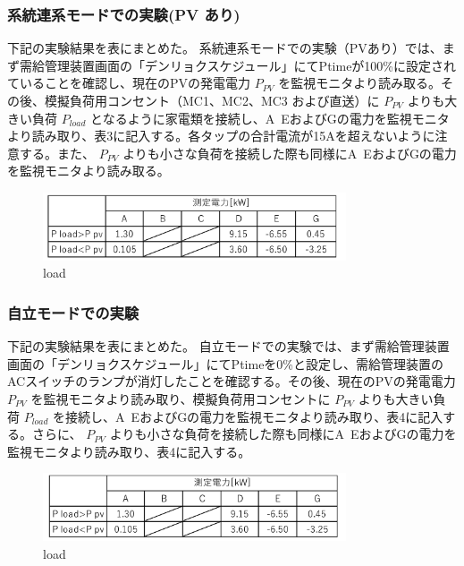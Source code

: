 \documentclass[a4paper,11pt,xelatex,ja=standard]{bxjsarticle}
\begin{document}
                \subsubsection{系統連系モードでの実験(PV あり)}
                    下記の実験結果を表にまとめた。
                    系統連系モードでの実験（PVあり）では、まず需給管理装置画面の「デンリョクスケジュール」にてPtimeが100\%に設定されていることを確認し、現在のPVの発電電力 \(P_{PV}\) を監視モニタより読み取る。その後、模擬負荷用コンセント（MC1、MC2、MC3 および直送）に \(P_{PV}\) よりも大きい負荷 \(P_{load}\) となるように家電類を接続し、A~EおよびGの電力を監視モニタより読み取り、表3に記入する。各タップの合計電流が15Aを超えないように注意する。また、 \(P_{PV}\) よりも小さな負荷を接続した際も同様にA~EおよびGの電力を監視モニタより読み取る。
                    \begin{figure}[H]
                        \centering
                        \includegraphics[width=0.8\textwidth]{./img/24-1/1.png}
                        \caption{load}
                    \end{figure}

                \subsubsection{自立モードでの実験}
                    下記の実験結果を表にまとめた。
                    自立モードでの実験では、まず需給管理装置画面の「デンリョクスケジュール」にてPtimeを0\%と設定し、需給管理装置のACスイッチのランプが消灯したことを確認する。その後、現在のPVの発電電力 \(P_{PV}\) を監視モニタより読み取り、模擬負荷用コンセントに \(P_{PV}\) よりも大きい負荷 \(P_{load}\) を接続し、A~EおよびGの電力を監視モニタより読み取り、表4に記入する。さらに、 \(P_{PV}\) よりも小さな負荷を接続した際も同様にA~EおよびGの電力を監視モニタより読み取り、表4に記入する。
                    \begin{figure}[H]
                        \centering
                        \includegraphics[width=0.8\textwidth]{./img/24-1/2.png}
                        \caption{load}
                    \end{figure}
                
\end{document}
